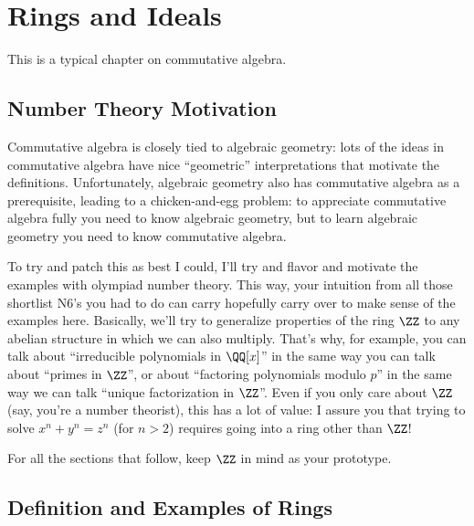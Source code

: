 \chapter{Rings and Ideals}
This is a typical chapter on commutative algebra.

\section{Number Theory Motivation}
Commutative algebra is closely tied to algebraic geometry:
lots of the ideas in commutative algebra have nice ``geometric'' interpretations that motivate the definitions.
Unfortunately, algebraic geometry also has commutative algebra as a prerequisite, leading to a
chicken-and-egg problem: to appreciate commutative algebra fully you need to know algebraic geometry,
but to learn algebraic geometry you need to know commutative algebra.

To try and patch this as best I could, I'll try and flavor and motivate the examples with olympiad number theory.
This way, your intuition from all those shortlist N6's you had to do can carry hopefully carry over to
make sense of the examples here.
Basically, we'll try to generalize properties of the ring $\ZZ$ to any abelian structure
in which we can also multiply.
That's why, for example, you can talk about ``irreducible polynomials in $\QQ[x]$'' in the same
way you can talk about ``primes in $\ZZ$'', or about ``factoring polynomials modulo $p$''
in the same way we can talk ``unique factorization in $\ZZ$''.
Even if you only care about $\ZZ$ (say, you're a number theorist), this has a lot of value:
I assure you that trying to solve $x^n+y^n = z^n$ (for $n > 2$) requires going into a ring other than $\ZZ$!

For all the sections that follow, keep $\ZZ$ in mind as your prototype.

\section{Definition and Examples of Rings}

